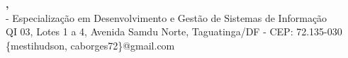 \begin{center}
  \begin{singlespace}
  \Large{
    \titulo\\
    \subtitulo\\
  }
  \vspace*{.5cm}
    \normalsize{
      \textbf{
        \autor,
        \orientador\\
      }
    }
  \vspace*{.5cm}
  \small{
    \instituicao -
    Especialização em Desenvolvimento e Gestão de Sistemas de Informação\\
    QI 03, Lotes 1 a 4, Avenida Samdu Norte, Taguatinga/DF - CEP: 72.135-030\\
  }
  \vspace*{.5cm}
  {\ttfamily \footnotesize{\{mestihudson, caborges72\}@gmail.com}}
  \end{singlespace}
\end{center}

